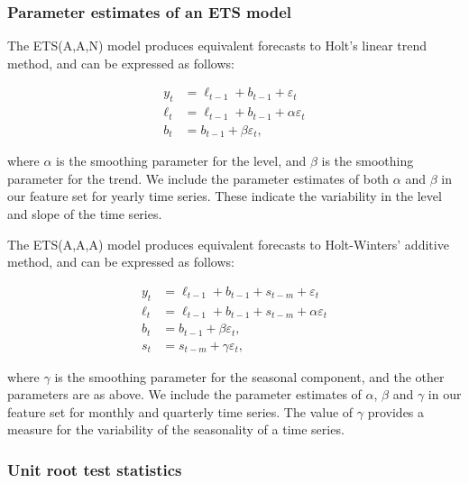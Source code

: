 \documentclass[11pt,a4paper,]{article}
\begin{document}
\subsubsection*{Parameter estimates of an ETS
model}\label{parameter-estimates-of-an-ets-model}

The ETS(A,A,N) model \autocite{expsmooth08} produces equivalent
forecasts to Holt's linear trend method, and can be expressed as
follows:

\begin{align*}
  y_t    & = \ell_{t-1}+b_{t-1}+\varepsilon_t\\
  \ell_t & = \ell_{t-1}+b_{t-1}+\alpha \varepsilon_t\\
  b_t    & = b_{t-1}+\beta \varepsilon_t,
\end{align*}

where \(\alpha\) is the smoothing parameter for the level, and \(\beta\)
is the smoothing parameter for the trend. We include the parameter
estimates of both \(\alpha\) and \(\beta\) in our feature set for yearly
time series. These indicate the variability in the level and slope of
the time series.

The ETS(A,A,A) model \autocite{expsmooth08} produces equivalent
forecasts to Holt-Winters' additive method, and can be expressed as
follows:

\begin{align*}
  y_t    & = \ell_{t-1}+b_{t-1}+s_{t-m}+\varepsilon_t\\
  \ell_t & = \ell_{t-1}+b_{t-1}+s_{t-m}+\alpha \varepsilon_t\\
  b_t    & = b_{t-1}+\beta \varepsilon_t,\\
  s_t &= s_{t-m} + \gamma\varepsilon_t,
\end{align*}

where \(\gamma\) is the smoothing parameter for the seasonal component,
and the other parameters are as above. We include the parameter
estimates of \(\alpha\), \(\beta\) and \(\gamma\) in our feature set for
monthly and quarterly time series. The value of \(\gamma\) provides a
measure for the variability of the seasonality of a time series.

\subsubsection*{Unit root test
statistics}\label{unit-root-test-statistics}
\end{document}
